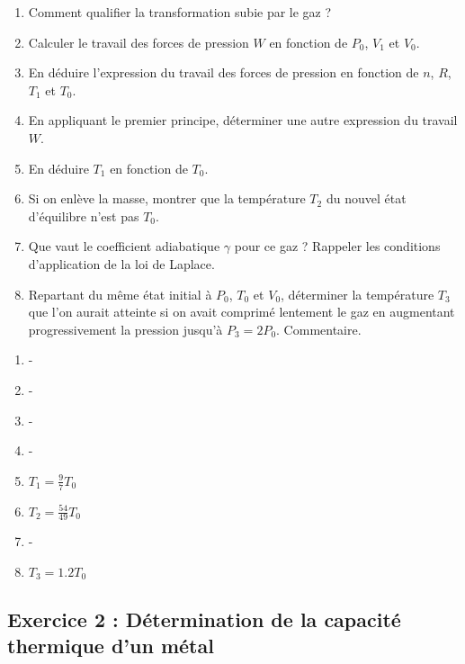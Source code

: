 \begin{enumerate}
	\item Comment qualifier la transformation subie par le gaz ?
	\item Calculer le travail des forces de pression $W$ en fonction de $P_0$, $V_1$ et $V_0$.
	\item En déduire l'expression du travail des forces de pression en fonction de $n$, $R$, $T_1$ et $T_0$.
	\item En appliquant le premier principe, déterminer une autre expression du travail $W$.
	\item En déduire $T_1$ en fonction de $T_0$.
	\item Si on enlève la masse, montrer que la température $T_2$ du nouvel état d'équilibre n'est pas $T_0$.
	\item Que vaut le coefficient adiabatique $\gamma$ pour ce gaz ? Rappeler les conditions d'application de la loi de Laplace.
	\item Repartant du même état initial à $P_0$, $T_0$ et $V_0$, déterminer la température $T_3$ que l'on aurait atteinte si on avait comprimé lentement le gaz en augmentant progressivement la pression jusqu'à $P_3 = 2P_0$. Commentaire.
\end{enumerate}

\begin{enumerate}
	\item -
	\item -
	\item -
	\item -
	\item $T_1 = \frac{9}{7}T_0$
	\item $T_2 = \frac{54}{49}T_0$
	\item -
	\item $T_3 = 1.2 T_0$
\end{enumerate}


\subsection{Exercice 2 : Détermination de la capacité thermique d'un métal}


